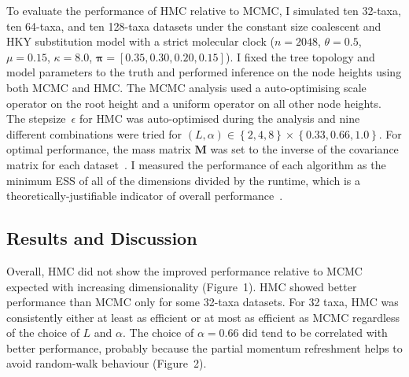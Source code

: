 \documentclass{article}
\renewcommand{\vec}[1]{\ensuremath{\boldsymbol{\mathbf{#1}}}}
\newcommand{\mat}[1]{\ensuremath{\boldsymbol{\mathbf{#1}}}}
\begin{document}
    To evaluate the performance of \ac{HMC} relative to \ac{MCMC}, I simulated
        ten 32-taxa, ten 64-taxa, and ten 128-taxa datasets under the constant
        size coalescent and HKY substitution model with a strict molecular
        clock ($n = 2048$, $\theta = 0.5$, $\mu = 0.15$, $\kappa = 8.0$,
        $\vec{\pi} = \left[0.35, 0.30, 0.20, 0.15\right]$).
    I fixed the tree topology and model parameters to the truth and performed
        inference on the node heights using both \ac{MCMC} and \ac{HMC}.
    The \ac{MCMC} analysis used a auto-optimising scale operator on the root
        height and a uniform operator on all other node heights.
    The stepsize~$\epsilon$ for \ac{HMC} was auto-optimised during the analysis
        and nine different combinations were tried for
        $\left(L, \alpha\right) \in \left\{2, 4, 8\right\} \times \left\{0.33, 0.66, 1.0\right\}$.
    For optimal performance, the mass matrix $\mat{M}$ was set to the inverse
        of the covariance matrix for each dataset~\cite{Nea11}.
    I measured the performance of each algorithm as the minimum \ac{ESS} of
        all of the dimensions divided by the runtime, which is a
        theoretically-justifiable indicator of overall
        performance~\cite{Tho10}.

    \subsection*{Results and Discussion}

    Overall, \ac{HMC} did not show the improved performance relative to
        \ac{MCMC} expected with increasing dimensionality (Figure~1).
    \ac{HMC} showed better performance than \ac{MCMC} only for some 32-taxa
        datasets.
    For 32 taxa, \ac{HMC} was consistently either at least as efficient or at
        most as efficient as \ac{MCMC} regardless of the choice of $L$ and
        $\alpha$.
    The choice of $\alpha = 0.66$ did tend to be correlated with better
        performance, probably because the partial momentum refreshment helps to
        avoid random-walk behaviour (Figure~2).
\end{document}
